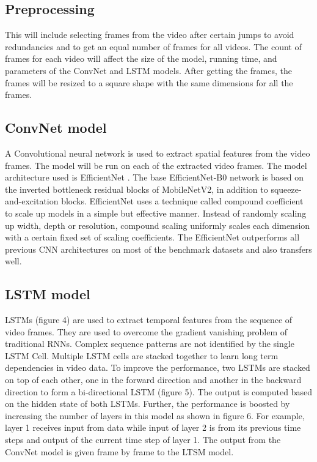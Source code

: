 \documentclass[twocolumn]{article}
\begin{document}
\subsection{Preprocessing}
This will include selecting frames from the video after certain jumps to avoid redundancies and to get an equal number of frames for all videos. The count of frames for each video will affect the size of the model, running time, and parameters of the ConvNet and LSTM models. After getting the frames, the frames will be resized to a square shape with the same dimensions for all the frames.

\subsection{ConvNet model}
A Convolutional neural network is used to extract spatial features from the video frames. The model will be run on each of the extracted video frames. The model architecture used is EfficientNet \cite{b13}. The base EfficientNet-B0 network is based on the inverted bottleneck residual blocks of MobileNetV2, in addition to squeeze-and-excitation blocks. EfficientNet uses a technique called compound coefficient to scale up models in a simple but effective manner. Instead of randomly scaling up width, depth or resolution, compound scaling uniformly scales each dimension with a certain fixed set of scaling coefficients. The EfficientNet outperforms all previous CNN architectures on most of the benchmark datasets and also transfers well.

\subsection{LSTM model}
LSTMs (figure 4) are used to extract temporal features from the sequence of video frames. They are used to overcome the gradient vanishing problem of traditional RNNs. Complex sequence patterns are not identified by the single LSTM Cell. Multiple LSTM cells are stacked together to learn long term dependencies in video data. To improve the performance, two LSTMs are stacked on top of each other, one in the forward direction and another in the backward direction to form a bi-directional LSTM (figure 5). The output is computed based on the hidden state of both LSTMs. Further, the performance is boosted by increasing the number of layers in this model as shown in figure 6. For example, layer 1 receives input from data while input of layer 2 is from its previous time steps and output of the current time step of layer 1. The output from the ConvNet model is given frame by frame to the LTSM model.
\end{document}
